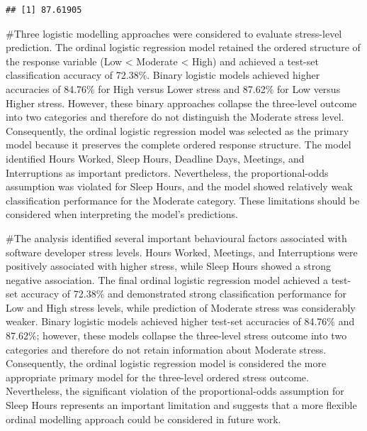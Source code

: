 \documentclass[
]{article}
\begin{document}
\begin{verbatim}
## [1] 87.61905
\end{verbatim}

\#Three logistic modelling approaches were considered to evaluate
stress-level prediction. The ordinal logistic regression model retained
the ordered structure of the response variable (Low \textless{} Moderate
\textless{} High) and achieved a test-set classification accuracy of
72.38\%. Binary logistic models achieved higher accuracies of 84.76\%
for High versus Lower stress and 87.62\% for Low versus Higher stress.
However, these binary approaches collapse the three-level outcome into
two categories and therefore do not distinguish the Moderate stress
level. Consequently, the ordinal logistic regression model was selected
as the primary model because it preserves the complete ordered response
structure. The model identified Hours Worked, Sleep Hours, Deadline
Days, Meetings, and Interruptions as important predictors. Nevertheless,
the proportional-odds assumption was violated for Sleep Hours, and the
model showed relatively weak classification performance for the Moderate
category. These limitations should be considered when interpreting the
model's predictions.

\#The analysis identified several important behavioural factors
associated with software developer stress levels. Hours Worked,
Meetings, and Interruptions were positively associated with higher
stress, while Sleep Hours showed a strong negative association. The
final ordinal logistic regression model achieved a test-set accuracy of
72.38\% and demonstrated strong classification performance for Low and
High stress levels, while prediction of Moderate stress was considerably
weaker. Binary logistic models achieved higher test-set accuracies of
84.76\% and 87.62\%; however, these models collapse the three-level
stress outcome into two categories and therefore do not retain
information about Moderate stress. Consequently, the ordinal logistic
regression model is considered the more appropriate primary model for
the three-level ordered stress outcome. Nevertheless, the significant
violation of the proportional-odds assumption for Sleep Hours represents
an important limitation and suggests that a more flexible ordinal
modelling approach could be considered in future work.
\end{document}
